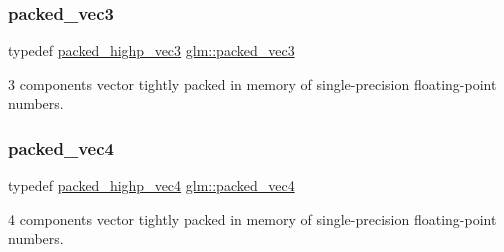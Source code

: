\subsubsection{\texorpdfstring{packed\+\_\+vec3}{packed\_vec3}}
{\footnotesize\ttfamily typedef \hyperlink{group__gtc__type__aligned_ga6814dd861e658e724ce9e5e673a4486b}{packed\+\_\+highp\+\_\+vec3} \hyperlink{group__gtc__type__aligned_ga8e23eba0ebe21b912cd783f69fa3a99b}{glm\+::packed\+\_\+vec3}}



3 components vector tightly packed in memory of single-\/precision floating-\/point numbers. 

\mbox{\label{group__gtc__type__aligned_gacb6d3e09d6aa52d954934e570b5c4fb1}} 
\subsubsection{\texorpdfstring{packed\+\_\+vec4}{packed\_vec4}}
{\footnotesize\ttfamily typedef \hyperlink{group__gtc__type__aligned_gabbc42b2b5ad854c60821526c4e291161}{packed\+\_\+highp\+\_\+vec4} \hyperlink{group__gtc__type__aligned_gacb6d3e09d6aa52d954934e570b5c4fb1}{glm\+::packed\+\_\+vec4}}



4 components vector tightly packed in memory of single-\/precision floating-\/point numbers. 

